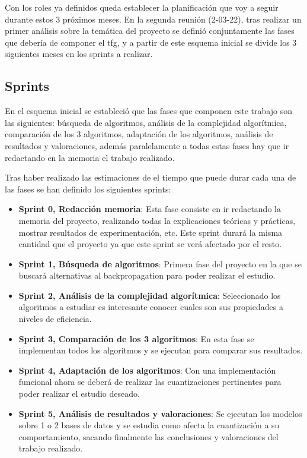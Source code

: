 Con los roles ya definidos queda establecer la planificación que voy a seguir durante estos 3 próximos meses. En la segunda reunión (2-03-22), tras realizar un primer análisis sobre la temática del proyecto se definió conjuntamente las fases que debería de componer el tfg, y a partir de este esquema inicial se divide los 3 siguientes meses en los sprints a realizar.

\subsection{Sprints}

En el esquema inicial se estableció que las fases que componen este trabajo son las siguientes: búsqueda de algoritmos, análisis de la complejidad algorítmica, comparación de los 3 algoritmos, adaptación de los algoritmos, análisis de resultados y valoraciones, además paralelamente a todas estas fases hay que ir redactando en la memoria el trabajo realizado.

Tras haber realizado las estimaciones de el tiempo que puede durar cada una de las fases se han definido los siguientes sprints:

\begin{itemize}
    \item \textbf{Sprint 0, Redacción memoria}: Esta fase consiste en ir redactando la memoria del proyecto, realizando todas la explicaciones teóricas y prácticas, mostrar resultados de experimentación, etc. Este sprint durará la misma cantidad que el proyecto ya que este sprint se verá afectado por el resto. 
    \item \textbf{Sprint 1, Búsqueda de algoritmos}: Primera fase del proyecto en la que se buscará alternativas al backpropagation para poder realizar el estudio.
    \item \textbf{Sprint 2, Análisis de la complejidad algorítmica}: Seleccionado los algoritmos a estudiar es interesante conocer cuales son sus propiedades a niveles de eficiencia.
    \item \textbf{Sprint 3, Comparación de los 3 algoritmos}: En esta fase se implementan todos los algoritmos y se ejecutan para comparar sus resultados.
    \item \textbf{Sprint 4, Adaptación de los algoritmos}: Con una implementación funcional ahora se deberá de realizar las cuantizaciones pertinentes para poder realizar el estudio deseado.
    \item \textbf{Sprint 5, Análisis de resultados y valoraciones}: Se ejecutan los modelos sobre 1 o 2 bases de datos y se estudia como afecta la cuantización a su comportamiento, sacando finalmente las conclusiones y valoraciones del trabajo realizado.
    
\end{itemize}

